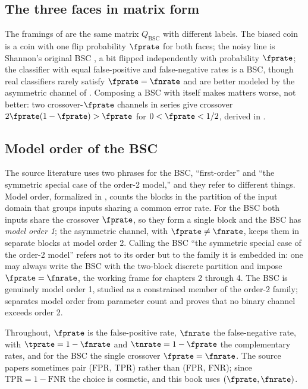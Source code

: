 \subsection*{The three faces in matrix form}

The framings of  are the same matrix $Q_{\mathrm{BSC}}$
with different labels. The biased coin is a coin with one flip probability
$\fprate$ for both faces; the noisy line is Shannon's original BSC
\cite{shannon-1948}, a bit flipped independently with probability $\fprate$;
the classifier with equal false-positive and false-negative rates is a BSC,
though real classifiers rarely satisfy $\fprate = \fnrate$ and are better
modeled by the asymmetric channel of . Composing a
BSC with itself makes matters worse, not better: two crossover-$\fprate$
channels in series give crossover $2\fprate(1 - \fprate) > \fprate$ for
$0 < \fprate < 1/2$, derived in .

\subsection*{Model order of the BSC}

The source literature uses two phrases for the BSC, ``first-order'' and ``the
symmetric special case of the order-2 model,'' and they refer to different
things. Model order, formalized in , counts the blocks in
the partition of the input domain that groups inputs sharing a common error
rate. For the BSC both inputs share the crossover $\fprate$, so they form a
single block and the BSC has \emph{model order 1}; the asymmetric channel, with
$\fprate \neq \fnrate$, keeps them in separate blocks at model order 2. Calling
the BSC ``the symmetric special case of the order-2 model'' refers not to its
order but to the family it is embedded in: one may always write the BSC with
the two-block discrete partition and impose $\fprate = \fnrate$, the working
frame for chapters 2 through 4. The BSC is genuinely model order 1, studied as a
constrained member of the order-2 family;  separates model
order from parameter count and proves that no binary channel exceeds order 2.

Throughout, $\fprate$ is the false-positive rate, $\fnrate$ the false-negative
rate, with $\tprate = 1 - \fnrate$ and $\tnrate = 1 - \fprate$ the
complementary rates, and for the BSC the single crossover $\fprate = \fnrate$.
The source papers sometimes pair (FPR, TPR) rather than (FPR, FNR); since
$\mathrm{TPR} = 1 - \mathrm{FNR}$ the choice is cosmetic, and this book uses
$(\fprate, \fnrate)$.
